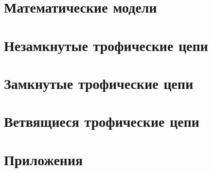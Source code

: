 \documentclass[
    14pt, 
    a4paper, 
    titlepage, 
    fleqn
]{extarticle}
\begin{document}
    
    
    \tableofcontents

    \pagebreak

    
    
    \pagebreak

    \section{Математические модели}
    

    \pagebreak

    

    \pagebreak

    \section{Незамкнутые трофические цепи}
    

    \pagebreak

    

    \pagebreak

    \section{Замкнутые трофические цепи}
    

    \pagebreak

    

    \section{Ветвящиеся трофические цепи}
    

    \pagebreak



    

    \pagebreak

    

    \pagebreak
    
    \section{Приложения}
    
\end{document}
